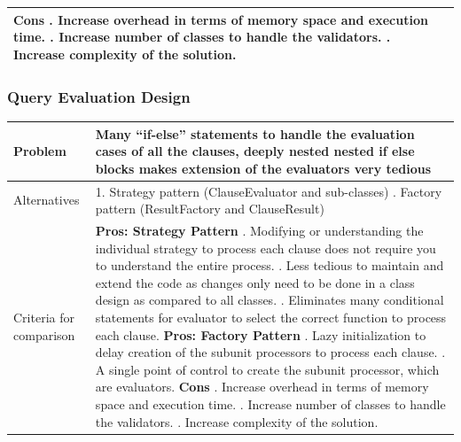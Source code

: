 \documentclass[12pt]{article}
\begin{document}
{{{{{{{{{{\begin{tabular}{|L{5cm} | L{12cm}| }
\textbf{Cons} . Increase overhead in terms of memory space and execution time.
. Increase number of classes to handle the validators.
. Increase complexity of the solution.
\\
 \hline
\end{tabular}
\subsubsection{Query Evaluation Design}
\begin{tabular}{|L{5cm} | L{12cm}| }
\hline
{}Problem &
Many “if-else” statements to handle the evaluation cases of all the clauses, deeply nested nested if else blocks makes extension of the evaluators very tedious
 \\
    \hline
{}Alternatives &
1. Strategy pattern (ClauseEvaluator and sub-classes)
. Factory pattern (ResultFactory and ClauseResult)
 \\
\hline
{}Criteria for comparison &
\textbf{Pros: Strategy Pattern} . Modifying or understanding the individual strategy to process each clause does not require you to understand the entire process.
. Less tedious to maintain and extend the code as changes only need to be done in a class design as compared to all classes.
. Eliminates many conditional statements for evaluator to select the correct function to process each clause. \newline
\textbf{Pros: Factory Pattern} . Lazy initialization to delay creation of the subunit processors to process each clause. 
. A single point of control to create the subunit processor, which are evaluators.\newline
\textbf{Cons} . Increase overhead in terms of memory space and execution time.
. Increase number of classes to handle the validators.
. Increase complexity of the solution.
\\
 \hline
\end{tabular}
}}}}}}}}}}
\end{document}
